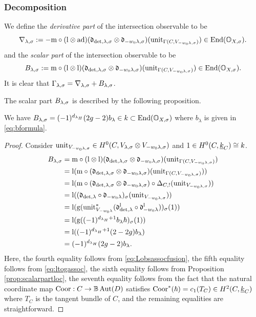 \documentclass[reqno]{amsart}
\numberwithin{equation}{section}
\numberwithin{equation}{section}
\begin{document}
\subsubsection{Decomposition}
We define the \emph{derivative part} of the intersection observable to be \begin{equation}
    \nabla_{\lambda,\sigma}:= -\mathrm{m}\circ (\mathrm{l}\otimes\mathrm{ad})(\mathfrak{d}_{\det,\lambda,\sigma}\otimes \mathfrak{d}_{-w_0\lambda,\sigma}) (\mathrm{unit}_{\Gamma(C,V_{-w_0\lambda,\sigma})})\in \operatorname{End}(\mathbb{O}_{X,\sigma}).
\end{equation} and the \emph{scalar part} of the intersection observable to be \begin{equation}
    B_{\lambda,\sigma}:= \mathrm{m}\circ (\mathrm{l}\otimes\mathrm{l})(\mathfrak{d}_{\det,\lambda,\sigma}\otimes \mathfrak{d}_{-w_0\lambda,\sigma}) (\mathrm{unit}_{\Gamma(C,V_{-w_0\lambda,\sigma})})\in \operatorname{End}(\mathbb{O}_{X,\sigma}).
\end{equation} It is clear that $\Gamma_{\lambda,\sigma}=\nabla_{\lambda,\sigma}+B_{\lambda,\sigma}$.

The scalar part $B_{\lambda,\sigma}$ is described by the following proposition.
\begin{prop}\label{prop:scalarpart}
    We have $B_{\lambda,\sigma}=(-1)^{d_{\lambda_H}}(2g-2)b_{\lambda}\in k\subset \operatorname{End}(\mathbb{O}_{X,\sigma})$ where $b_{\lambda}$ is given in \eqref{eq:bformula}.
\end{prop}

\begin{proof}
    Consider $\mathrm{unit}_{V_{-w_0\lambda,\sigma}}\in H^0(C, V_{\lambda,\sigma}\otimes V_{-w_0\lambda,\sigma})$ and $1 \in H^0(C,\underline{k}_{C})\cong k$.
    \[\begin{split}
        B_{\lambda,\sigma} & = \mathrm{m}\circ (\mathrm{l}\otimes\mathrm{l})(\mathfrak{d}_{\det,\lambda,\sigma}\otimes \mathfrak{d}_{-w_0\lambda,\sigma}) (\mathrm{unit}_{\Gamma(C,V_{-w_0\lambda,\sigma})}) \\
        & = \mathrm{l}(\mathrm{m}\circ (\mathfrak{d}_{\det,\lambda,\sigma}\otimes \mathfrak{d}_{-w_0\lambda,\sigma})(\mathrm{unit}_{\Gamma(C,V_{-w_0\lambda,\sigma})})) \\ 
        & = \mathrm{l}(\mathrm{m}\circ (\mathfrak{d}_{\det,\lambda,\sigma}\otimes \mathfrak{d}_{-w_0\lambda,\sigma})\circ \Delta_{C,!}(\mathrm{unit}_{V_{-w_0\lambda,\sigma}})) \\
        & = \mathrm{l}((\mathfrak{d}_{\det,\lambda}\circ \mathfrak{d}_{-w_0\lambda})_{\sigma}(\mathrm{unit}_{V_{-w_0\lambda,\sigma}})) \\ 
        & = \mathrm{l}(\mathrm{g}(\mathrm{unit}_{V_{-w_0\lambda}}^*(\mathfrak{d}_{\det,\lambda}^{\mathrm{l}}\circ \mathfrak{d}_{-w_0\lambda}^{\mathrm{l}}) )_{\sigma}(1) ) \\
        & = \mathrm{l}(\mathrm{g}((-1)^{d_{\lambda_H} +1}b_{\lambda}\hbar)_{\sigma}(1)) \\
        & = \mathrm{l}((-1)^{d_{\lambda_H} +1}(2-2g)b_{\lambda}) \\
        & = (-1)^{d_{\lambda_H}}(2g-2)b_{\lambda}.
    \end{split}\]
Here, the fourth equality follows from \eqref{eq:Lobsassocfusion}, the fifth equality follows from \eqref{eq:ltogassoc}, the sixth equality follows from Proposition \ref{prop:scalarpartloc}, the seventh equality follows from the fact that the natural coordinate map $\mathrm{Coor}: C\to \mathbb{B}\operatorname{Aut}(D)$ satisfies $\mathrm{Coor}^*(\hbar)=c_1(T_C)\in H^2(C,\underline{k}_C)$ where $T_C$ is the tangent bundle of $C$, and the remaining equalities are straightforward.
\end{proof}
\end{document}
